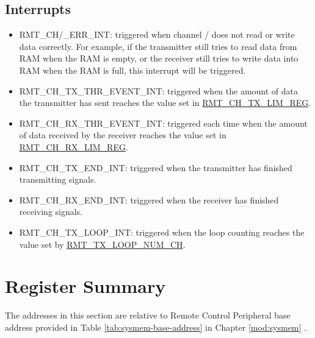 \documentclass[main\_\_EN.tex]{subfiles}
\begin{document}
\subsection{Interrupts}
\begin{itemize}
\item \label{int:RMTCHnERRINT}RMT\_CH/\_ERR\_INT: triggered when channel / does not read or write data correctly. For example, if the transmitter still tries to read data from RAM when the RAM is empty, or the receiver still tries to write data into RAM when the RAM is full, this interrupt will be triggered.    
\item \label{int:RMTCHnTXTHREVENTINT}RMT\_CH\_TX\_THR\_EVENT\_INT: triggered when the amount of data the transmitter has sent reaches the value set in \hyperref[regdesc:RMTCHNTXLIMREG]{RMT\_CH\_TX\_LIM\_REG}.
\item \label{int:RMTCHmRXTHREVENTINT}RMT\_CH\_RX\_THR\_EVENT\_INT: triggered each time when the amount of data received by the receiver reaches the value set in \hyperref[regdesc:RMTCHMRXLIMREG]{RMT\_CH\_RX\_LIM\_REG}. 
\item \label{int:RMTCHnTXENDINT}RMT\_CH\_TX\_END\_INT: triggered when the transmitter has finished transmitting signals.
\item \label{int:RMTCHnRXENDINT}RMT\_CH\_RX\_END\_INT: triggered when the receiver has finished receiving signals.
\item \label{int:RMTCHnTXLOOPINT}RMT\_CH\_TX\_LOOP\_INT: triggered when the loop counting reaches the value set by  \hyperref[fielddesc:RMTTXLOOPNUMCHN]{RMT\_TX\_LOOP\_NUM\_CH}.
\end{itemize}





\clearpage
\hypertarget{rmt-reg-summ}{}
\section{Register Summary}
\label{sec:rmt-reg-summ}

The addresses in this section are relative to Remote Control Peripheral base address provided in Table \ref{tab:sysmem-base-address} in Chapter \ref{mod:sysmem} \textit{}.
\end{document}

